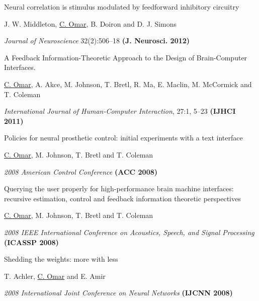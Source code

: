 \documentclass[10pt,letterpaper]{article}
\renewenvironment{itemize}{
  \begin{list}{}{
    \setlength{\leftmargin}{1.25em}
    \setlength{\itemsep}{0.25em}
    \setlength{\parskip}{0pt}
    \setlength{\parsep}{0.2em}
  }
}{
  \end{list}
}
\begin{document}
\begin{enumerate}
\begin{itemize}
  \end{itemize}
\item {Neural correlation is stimulus modulated by feedforward inhibitory circuitry}
  \begin{itemize}
    \item J. W. Middleton, \underline{C. Omar}, B. Doiron and D. J. Simons
    \item \textit{Journal of Neuroscience} 32(2):506--18 {\textbf{(J. Neurosci. 2012)}}
  \end{itemize}
\item A Feedback Information-Theoretic Approach to the Design of Brain-Computer Interfaces.
  \begin{itemize}
    \item  \underline{C. Omar}, A. Akce, M. Johnson, T. Bretl, R. Ma, E. Maclin, M. McCormick and T. Coleman
    \item \textit{International Journal of Human-Computer Interaction}, 27:1, 5--23 {\textbf{(IJHCI 2011)}}
  \end{itemize}
  \item Policies for neural prosthetic control: initial experiments with a text interface
  \begin{itemize}
    \item \underline{C. Omar}, M. Johnson, T. Bretl and T. Coleman
    \item \textit{2008 American Control Conference} {\textbf{(ACC 2008)}}
  \end{itemize}
\item Querying the user properly for high-performance brain machine interfaces: recursive estimation, control and feedback information theoretic perspectives
  \begin{itemize}
    \item \underline{C. Omar}, M. Johnson, T. Bretl and T. Coleman
    \item \textit{2008 IEEE International Conference on Acoustics, Speech, and Signal Processing} {\textbf{(ICASSP 2008)}}
  \end{itemize}
\item Shedding the weights: more with less
  \begin{itemize}
    \item T. Achler, \underline{C. Omar} and E. Amir
    \item \textit{2008 International Joint Conference on Neural Networks} {\textbf{(IJCNN 2008)}}
  \end{itemize}

\end{enumerate}
\end{document}
